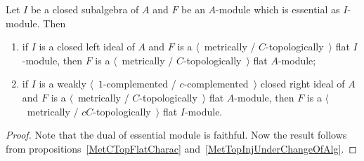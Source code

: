 \begin{proposition}\label{MetTopFlatUnderChangeOfAlg} Let $I$ be a closed
subalgebra of $A$ and $F$ be an $A$-module which is essential as $I$-module.
Then

\begin{enumerate}[label = (\roman*)]
    \item if $I$ is a closed left ideal of $A$ and $F$ is a $\langle$~metrically /
    $C$-topologically~$\rangle$  flat $I$-module, then $F$ is a 
    $\langle$~metrically / $C$-topologically~$\rangle$ flat $A$-module;

    \item if $I$ is a weakly $\langle$~$1$-complemented / 
    $c$-complemented~$\rangle$ closed right ideal of $A$ and $F$ 
    is a $\langle$~metrically / $C$-topologically~$\rangle$ flat $A$-module, 
    then $F$ is a $\langle$~metrically / $cC$-topologically~$\rangle$ 
    flat $I$-module.
\end{enumerate}
\end{proposition}
\begin{proof} Note that the dual of essential module is faithful. Now the result
follows from propositions~\ref{MetCTopFlatCharac} 
and~\ref{MetTopInjUnderChangeOfAlg}.
\end{proof}    

